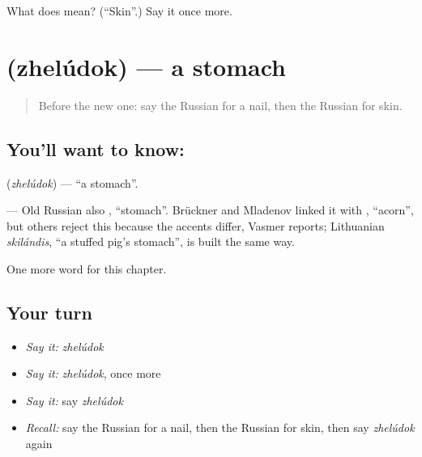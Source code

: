\begin{tcolorbox}[breakable,colback=teal!4,colframe=teal!35!black,title={Before you move on}]
What does  mean? (\textquotedblleft{}Skin\textquotedblright{}.) Say it once more.
\end{tcolorbox}
\section[\texorpdfstring{\ru{желудок} (zhelúdok)}{желудок (zhelúdok)}]{ (zhelúdok) — a stomach}

\label{lesson:RU-C121-stomach}



\begin{quote}
Before the new one: say the Russian for a nail, then the Russian for skin.
\end{quote}

\subsection*{You'll want to know: }
\textbf{} (\emph{zhelúdok}) — \textquotedblleft{}a stomach\textquotedblright{}.

\begin{cousinweb}
\textbf{} — Old Russian also \emph{}, \textquotedblleft{}stomach\textquotedblright{}. Brückner and Mladenov linked it with \emph{}, \textquotedblleft{}acorn\textquotedblright{}, but others reject this because the accents differ, Vasmer reports; Lithuanian \emph{skilándis}, \textquotedblleft{}a stuffed pig's stomach\textquotedblright{}, is built the same way.
\end{cousinweb}

\begin{grammarlens}[title={What you've built}]
One more word for this chapter.
\end{grammarlens}

\subsection*{Your turn}
\begin{itemize}
\raggedright
  \item \emph{Say it:} \emph{zhelúdok}
  \item \emph{Say it:} \emph{zhelúdok}, once more
  \item \emph{Say it:} say \emph{zhelúdok}
  \item \emph{Recall:} say the Russian for a nail, then the Russian for skin, then say \emph{zhelúdok} again
\end{itemize}


